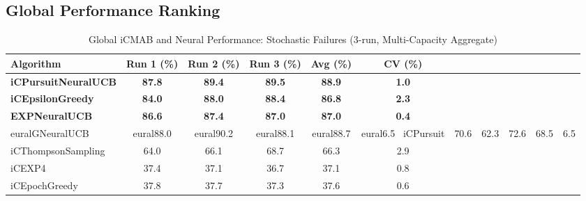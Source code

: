 \documentclass[12pt,a4paper]{article}
\newcommand{\primarytext}[1]{\textcolor{primaryblue}{\textbf{#1}}}
\newcommand{\legacy}[1]{\textcolor{legacycolor}{\textbf{#1}}}
\newcommand{\neural}[1]{\textcolor{neuralcolor}{\textbf{#1}}}
\begin{document}
\begin{tcolorbox}[colback=tableheader,colframe=primaryblue,title=\textbf{Primary iCMAB Performance Results (Stochastic Environment, Attack Rate: 0.25)}]

\subsection{Global Performance Ranking}

\begin{table}[H]
\footnotesize
\centering
\caption{Global iCMAB and Neural Performance: Stochastic Failures (3-run, Multi-Capacity Aggregate)}
\label{tab:global-performance-stochastic}
\begin{tabular}{@{}lccccc@{}}
\toprule
\textbf{Algorithm} & \textbf{Run 1 (\%)} & \textbf{Run 2 (\%)} & \textbf{Run 3 (\%)} & \textbf{Avg (\%)} & \textbf{CV (\%)} \\
\midrule
\neural{iCPursuitNeuralUCB}   & \neural{87.8} & \neural{89.4} & \neural{89.5} & \neural{88.9} & \neural{1.0} \\
\primarytext{iCEpsilonGreedy}   & \primarytext{84.0} & \primarytext{88.0} & \primarytext{88.4} & \primarytext{86.8} & \primarytext{2.3} \\
\legacy{EXPNeuralUCB}           & \legacy{86.6} & \legacy{87.4} & \legacy{87.0} & \legacy{87.0} & \legacy{0.4} \\

eural{GNeuralUCB}            & 
eural{88.0} & 
eural{90.2} & 
eural{88.1} & 
eural{88.7} & 
eural{6.5} \
iCPursuit                       & 70.6 & 62.3 & 72.6 & 68.5 & 6.5 \\
iCThompsonSampling              & 64.0 & 66.1 & 68.7 & 66.3 & 2.9 \\
iCEXP4                          & 37.4 & 37.1 & 36.7 & 37.1 & 0.8 \\
iCEpochGreedy                   & 37.8 & 37.7 & 37.3 & 37.6 & 0.6 \\
\bottomrule
\end{tabular}
\end{table}


\end{tcolorbox}
\end{document}
